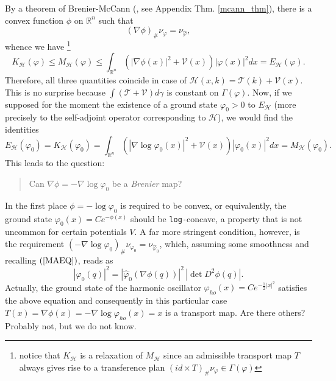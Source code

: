 \documentclass[12pt,a4paper]{article}
\newcommand{\RR}[1]{\mathbb{R}^#1}
\newcommand{\HH}{\mathcal{H}}
\newcommand{\TT}{\mathcal{T}}
\newcommand{\VV}{\mathcal{V}}
\begin{document}
By a theorem of Brenier-McCann (\cite{mccann_existence_1995}, see Appendix Thm. \ref{mcann_thm}),
there is a convex function $\phi$ on $\RR n$ such that
\begin{displaymath}
                  (\nabla\phi)_{\#}\nu_\varphi = \nu_{\hat\varphi},
\end{displaymath}
whence we have \footnote{notice that $K_\HH$ is a relaxation of $M_\HH$ since 
an admissible transport map $T$ always gives rise to a transference plan
$(id\times T)_{\#} \nu_{\varphi}\in\Gamma(\varphi)$} 
\begin{displaymath}
       K_\HH(\varphi)\leq M_\HH(\varphi) \leq \int_{\RR n}
           \left( |\nabla\phi(x)|^2+\VV(x) \right) |\varphi(x)|^2 dx = E_\HH(\varphi).
\end{displaymath}
Therefore, all three quantities coincide in case of $\HH(x,k)=\TT(k)+\VV(x)$. This
is no surprise because $\int (\TT+\VV) d\gamma$ is constant on $\Gamma(\varphi)$.
Now, if we supposed for the moment the existence of a ground state $\varphi_0>0$
to $E_\HH$ (more precisely to the self-adjoint operator corresponding to $\HH$),
we would find the identities
\begin{displaymath}
    E_\HH(\varphi_0)=K_\HH(\varphi_0)= 
       \int_{\RR n}
           \left( |\nabla\log{\varphi_0(x)}|^2+\VV(x) \right) |\varphi_0(x)|^2 dx
           = M_\HH(\varphi_0). 
\end{displaymath}
This leads to the question: 
\begin{verse}
     Can $\nabla\phi = - \nabla\log{\varphi_0}$ be a {\sl Brenier} map?
\end{verse}
In the first place $\phi=- \log{\varphi_0}$ is required to be convex, or equivalently,
the ground state $\varphi_0(x)=C e^{-\phi(x)}$ should be {\tt log-}concave,
a property that is not uncommon for certain potentials $V$. A far more
stringent condition, however, is the requirement 
$(-\nabla\log{\varphi_0})_{\#}\nu_{\varphi_0} = \nu_{\hat\varphi_0}$, which,
assuming some smoothness and recalling $(\ref{MAEQ})$, reads as
\begin{equation}
           |\varphi_0(q)|^2 = |\hat\varphi_0(\nabla\phi(q))|^2\, |\det{D^2\phi(q)}|.
\end{equation}
Actually, the ground state of the harmonic oscillator  
$\varphi_{ho}(x)=C e^{-\frac{1}{2}|x|^2 }$ satisfies the above equation and 
consequently in this particular case
$T(x)=\nabla\phi(x) = -\nabla\log{\varphi_{ho}(x)}=x$ is a transport map.
Are there others? Probably not, but we do not know. 
%
\end{document}
